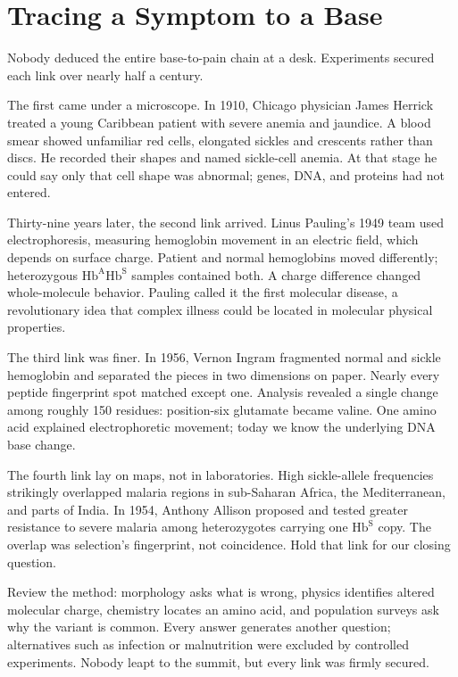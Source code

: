 \section{Tracing a Symptom to a Base}

\begin{zhengju}
Nobody deduced the entire base-to-pain chain at a desk. Experiments secured each link over nearly half a century.

The first came under a microscope. In 1910, Chicago physician James Herrick treated a young Caribbean patient with severe anemia and jaundice. A blood smear showed unfamiliar red cells, elongated sickles and crescents rather than discs. He recorded their shapes and named sickle-cell anemia. At that stage he could say only that cell shape was abnormal; genes, DNA, and proteins had not entered.

Thirty-nine years later, the second link arrived. Linus Pauling's 1949 team used electrophoresis, measuring hemoglobin movement in an electric field, which depends on surface charge. Patient and normal hemoglobins moved differently; heterozygous $\mathrm{Hb^{A}Hb^{S}}$ samples contained both. A charge difference changed whole-molecule behavior. Pauling called it the first molecular disease, a revolutionary idea that complex illness could be located in molecular physical properties.

The third link was finer. In 1956, Vernon Ingram fragmented normal and sickle hemoglobin and separated the pieces in two dimensions on paper. Nearly every peptide fingerprint spot matched except one. Analysis revealed a single change among roughly 150 residues: position-six glutamate became valine. One amino acid explained electrophoretic movement; today we know the underlying DNA base change.

The fourth link lay on maps, not in laboratories. High sickle-allele frequencies strikingly overlapped malaria regions in sub-Saharan Africa, the Mediterranean, and parts of India. In 1954, Anthony Allison proposed and tested greater resistance to severe malaria among heterozygotes carrying one $\mathrm{Hb^{S}}$ copy. The overlap was selection's fingerprint, not coincidence. Hold that link for our closing question.

Review the method: morphology asks what is wrong, physics identifies altered molecular charge, chemistry locates an amino acid, and population surveys ask why the variant is common. Every answer generates another question; alternatives such as infection or malnutrition were excluded by controlled experiments. Nobody leapt to the summit, but every link was firmly secured.
\end{zhengju}

